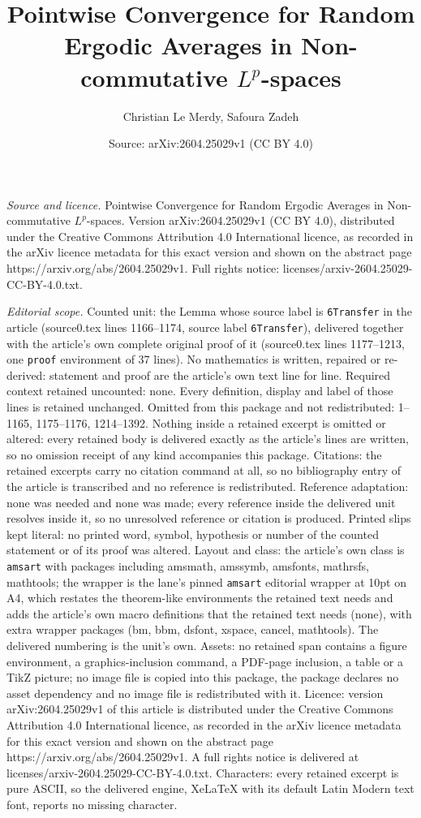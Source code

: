 \documentclass[10pt,a4paper]{amsart}
\title[Pointwise Convergence for Random Ergodic Averages in Non-com]{Pointwise Convergence for Random Ergodic Averages in Non-commutative $L^p$-spaces}
\author{Christian Le Merdy, Safoura Zadeh}
\date{Source: arXiv:2604.25029v1 (CC BY 4.0)}
\begin{document}
\maketitle

\noindent\emph{Source and licence.} Pointwise Convergence for Random Ergodic Averages in Non-commutative $L^p$-spaces. Version arXiv:2604.25029v1 (CC BY 4.0), distributed under the Creative Commons Attribution 4.0 International licence, as recorded in the arXiv licence metadata for this exact version and shown on the abstract page https://arxiv.org/abs/2604.25029v1. Full rights notice: licenses/arxiv-2604.25029-CC-BY-4.0.txt.\par\smallskip

\noindent\textit{Editorial scope.} Counted unit: the Lemma whose source label is \texttt{6Transfer} in the article (source0.tex lines 1166--1174, source label \texttt{6Transfer}), delivered together with the article's own complete original proof of it (source0.tex lines 1177--1213, one \texttt{proof} environment of 37 lines). No mathematics is written, repaired or re-derived: statement and proof are the article's own text line for line. Required context retained uncounted: none. Every definition, display and label of those lines is retained unchanged. Omitted from this package and not redistributed: 1--1165, 1175--1176, 1214--1392. Nothing inside a retained excerpt is omitted or altered: every retained body is delivered exactly as the article's lines are written, so no omission receipt of any kind accompanies this package. Citations: the retained excerpts carry no citation command at all, so no bibliography entry of the article is transcribed and no reference is redistributed. Reference adaptation: none was needed and none was made; every reference inside the delivered unit resolves inside it, so no unresolved reference or citation is produced. Printed slips kept literal: no printed word, symbol, hypothesis or number of the counted statement or of its proof was altered. Layout and class: the article's own class is \texttt{amsart} with packages including amsmath, amssymb, amsfonts, mathrsfs, mathtools; the wrapper is the lane's pinned \texttt{amsart} editorial wrapper at 10pt on A4, which restates the theorem-like environments the retained text needs and adds the article's own macro definitions that the retained text needs (none), with extra wrapper packages (bm, bbm, dsfont, xspace, cancel, mathtools). The delivered numbering is the unit's own. Assets: no retained span contains a figure environment, a graphics-inclusion command, a PDF-page inclusion, a table or a TikZ picture; no image file is copied into this package, the package declares no asset dependency and no image file is redistributed with it. Licence: version arXiv:2604.25029v1 of this article is distributed under the Creative Commons Attribution 4.0 International licence, as recorded in the arXiv licence metadata for this exact version and shown on the abstract page https://arxiv.org/abs/2604.25029v1. A full rights notice is delivered at licenses/arxiv-2604.25029-CC-BY-4.0.txt. Characters: every retained excerpt is pure ASCII, so the delivered engine, XeLaTeX with its default Latin Modern text font, reports no missing character.
\end{document}
